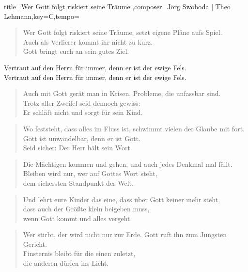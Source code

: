 \documentclass{leadsheet-modern}
\begin{document}
\begin{song}{title={Wer Gott folgt riskiert seine Träume
},composer={Jörg Swoboda | Theo Lehmann},key={C},tempo={}}

\begin{schedule}
\end{schedule}

\begin{intro}
\end{intro}

\begin{verse}
Wer Gott folgt riskiert seine Träume, 
setzt eigene Pläne aufs Spiel. \\
Auch als Verlierer kommt ihr nicht zu kurz. \\
Gott bringt euch an sein gutes Ziel.
\end{verse}

\begin{chorus}
Vertraut auf den Herrn für immer,
denn er ist der ewige Fels. \\
Vertraut auf den Herrn für immer,
denn er ist der ewige Fels.
\end{chorus}

\begin{verse}
Auch mit Gott gerät man in Krisen,
Probleme, die unfassbar sind. \\
Trotz aller Zweifel seid dennoch gewiss: \\
Er schläft nicht und sorgt für sein Kind.
\end{verse}

\begin{verse}
Wo feststeht, dass alles im Fluss ist,
schwimmt vielen der Glaube mit fort. \\
Gott ist unwandelbar, denn er ist Gott. \\
Seid sicher: Der Herr hält sein Wort.
\end{verse}

\begin{verse}
Die Mächtigen kommen und gehen,
und auch jedes Denkmal mal fällt. \\
Bleiben wird nur, wer auf Gottes Wort steht, \\
dem sichersten Standpunkt der Welt.
\end{verse}

\begin{verse}
Und lehrt eure Kinder das eine,
dass über Gott keiner mehr steht, \\
dass auch der Größte klein beigeben muss, \\
wenn Gott kommt und alles vergeht.
\end{verse}

\begin{verse}
Wer stirbt, der wird nicht nur zur Erde.
Gott ruft ihn zum Jüngsten Gericht. \\
Finsternis bleibt für die einen zuletzt, \\
die anderen dürfen ins Licht.
\end{verse}

\end{song}
\end{document}
